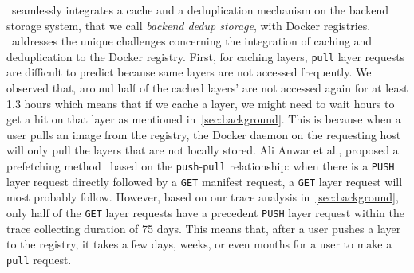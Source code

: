 \sysname~seamlessly integrates 
a cache and a deduplication mechanism on the
backend storage system, that we call \emph{backend dedup storage}, with Docker registries.
\sysname~addresses the unique challenges concerning the integration
of caching and deduplication to the Docker registry.
First, for caching layers, \texttt{pull} layer requests are difficult to
predict because same layers are not accessed frequently.
We observed that, around half of the cached layers' are not
accessed again for at least 1.3 hours which means that if we
cache a layer, we might need to wait hours to get a hit on that layer as mentioned in~\cref{sec:background}.  
This is
because when a user pulls an image from the registry, the Docker daemon on the
requesting host will only pull the layers that are not locally stored.
Ali Anwar et
al., proposed a prefetching method~\cite{dockerworkload} based on the
\texttt{push}-\texttt{pull} relationship: when there is a \texttt{PUSH} layer
request directly followed by a \texttt{GET} manifest request, a \texttt{GET}
layer request will most probably follow. 
However, based on our trace analysis in~\cref{sec:background},
only half of the \texttt{GET} layer
requests have a precedent \texttt{PUSH} layer request within the trace
collecting duration of 75 days. This means that, after a user pushes a layer
to the registry, it takes a few days, weeks, or even months for a user to make
a \texttt{pull} request.

